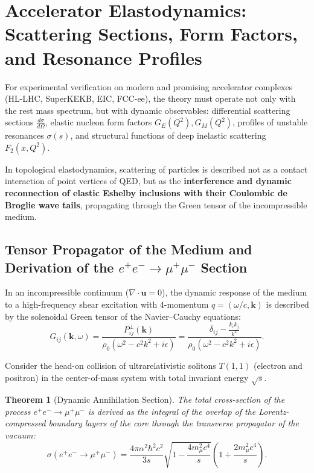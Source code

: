 \documentclass[12pt,a4paper]{article}
\newtheorem{theorem}{Theorem}
\begin{document}
\section{Accelerator Elastodynamics: Scattering Sections, Form Factors, and Resonance Profiles}
															
	For experimental verification on modern and promising accelerator complexes (HL-LHC, SuperKEKB, EIC, FCC-ee), the theory must operate not only with the rest mass spectrum, but with dynamic observables: differential scattering sections $\frac{d\sigma}{d\Omega}$, elastic nucleon form factors $G_E(Q^2), G_M(Q^2)$, profiles of unstable resonances $\sigma(s)$, and structural functions of deep inelastic scattering $F_2(x, Q^2)$.
															
	In topological elastodynamics, scattering of particles is described not as a contact interaction of point vertices of QED, but as the \textbf{interference and dynamic reconnection of elastic Eshelby inclusions with their Coulombic de Broglie wave tails}, propagating through the Green tensor of the incompressible medium.
														
	\subsection{Tensor Propagator of the Medium and Derivation of the $e^+ e^- \to \mu^+ \mu^-$ Section}
	In an incompressible continuum ($\nabla \cdot \mathbf{u} = 0$), the dynamic response of the medium to a high-frequency shear excitation with 4-momentum $q = (\omega/c, \mathbf{k})$ is described by the solenoidal Green tensor of the Navier--Cauchy equations:
\begin{equation}
G_{ij}(\mathbf{k}, \omega) = \frac{P_{ij}^\perp(\mathbf{k})}{\rho_0 (\omega^2 - c^2 k^2 + i\epsilon)} = \frac{\delta_{ij} - \frac{k_i k_j}{k^2}}{\rho_0 (\omega^2 - c^2 k^2 + i\epsilon)}.
\end{equation}
															
Consider the head-on collision of ultrarelativistic solitons $T(1,1)$ (electron and positron) in the center-of-mass system with total invariant energy $\sqrt{s}$.
															
\begin{theorem}[Dynamic Annihilation Section]
The total cross-section of the process $e^+ e^- \to \mu^+ \mu^-$ is derived as the integral of the overlap of the Lorentz-compressed boundary layers of the core through the transverse propagator of the vacuum:
\begin{equation}
	\sigma(e^+ e^- \to \mu^+ \mu^-) = \frac{4\pi \alpha^2 \hbar^2 c^2}{3s} \sqrt{1 - \frac{4m_\mu^2 c^4}{s}} \left( 1 + \frac{2m_\mu^2 c^4}{s} \right).
\end{equation}
\end{theorem}
																
\end{document}
